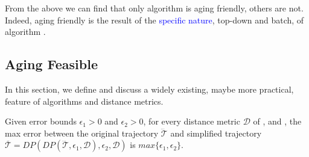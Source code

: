 From the above we can find that only algorithm \dpa is aging friendly, others are not. Indeed, {aging friendly} is the result of the \textcolor{blue}{specific nature}, \ie top-down and batch, of algorithm \dpa.


\subsection{Aging Feasible}
In this section, we define and discuss a widely existing, maybe more practical, feature of \lsa algorithms and distance metrics.


\begin{theorem}
	\label{theo-aging-dp}
	Given error bounds $\epsilon_1>0$ and $\epsilon_2>0$, for every distance metric $\mathcal{D}$ of \ped, \sed and \dad, the max error between the original trajectory $\dddot{\mathcal{T}}$ and simplified trajectory $\overline{\mathcal{T}}=DP(DP(\dddot{\mathcal{T}}, \epsilon_1, \mathcal{D}), \epsilon_2, \mathcal{D})$ is $max\{\epsilon_1, \epsilon_2\}$.
\end{theorem}

